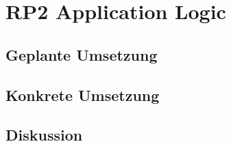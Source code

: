 \section{RP2 Application Logic}
\label{sec:principle-rp2-application-logic}

\subsection*{Geplante Umsetzung}


\subsection*{Konkrete Umsetzung}


\subsection*{Diskussion}
